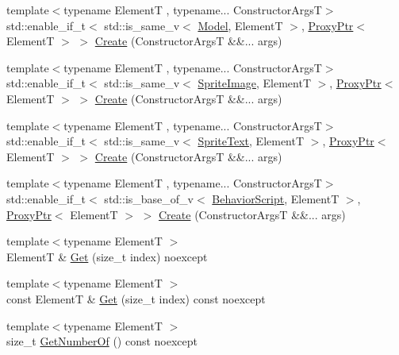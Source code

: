 \begin{DoxyCompactItemize}
\item 
{\footnotesize template$<$typename ElementT , typename... Constructor\+ArgsT$>$ }\\std\+::enable\+\_\+if\+\_\+t$<$ std\+::is\+\_\+same\+\_\+v$<$ \hyperlink{classmage_1_1_model}{Model}, ElementT $>$, \hyperlink{classmage_1_1_proxy_ptr}{Proxy\+Ptr}$<$ ElementT $>$ $>$ \hyperlink{classmage_1_1_scene_a0f8724805acbb6ae4ca5155306154ab1}{Create} (Constructor\+ArgsT \&\&... args)
\item 
{\footnotesize template$<$typename ElementT , typename... Constructor\+ArgsT$>$ }\\std\+::enable\+\_\+if\+\_\+t$<$ std\+::is\+\_\+same\+\_\+v$<$ \hyperlink{classmage_1_1_sprite_image}{Sprite\+Image}, ElementT $>$, \hyperlink{classmage_1_1_proxy_ptr}{Proxy\+Ptr}$<$ ElementT $>$ $>$ \hyperlink{classmage_1_1_scene_a80e11f9f4424a0d250b1f83fe2caf275}{Create} (Constructor\+ArgsT \&\&... args)
\item 
{\footnotesize template$<$typename ElementT , typename... Constructor\+ArgsT$>$ }\\std\+::enable\+\_\+if\+\_\+t$<$ std\+::is\+\_\+same\+\_\+v$<$ \hyperlink{classmage_1_1_sprite_text}{Sprite\+Text}, ElementT $>$, \hyperlink{classmage_1_1_proxy_ptr}{Proxy\+Ptr}$<$ ElementT $>$ $>$ \hyperlink{classmage_1_1_scene_a8c1fe27bd2930d8300265332631ec5c0}{Create} (Constructor\+ArgsT \&\&... args)
\item 
{\footnotesize template$<$typename ElementT , typename... Constructor\+ArgsT$>$ }\\std\+::enable\+\_\+if\+\_\+t$<$ std\+::is\+\_\+base\+\_\+of\+\_\+v$<$ \hyperlink{classmage_1_1_behavior_script}{Behavior\+Script}, ElementT $>$, \hyperlink{classmage_1_1_proxy_ptr}{Proxy\+Ptr}$<$ ElementT $>$ $>$ \hyperlink{classmage_1_1_scene_ab135fe20ddadf6c1e2820a9582a31e64}{Create} (Constructor\+ArgsT \&\&... args)
\item 
{\footnotesize template$<$typename ElementT $>$ }\\ElementT \& \hyperlink{classmage_1_1_scene_a51322766fa1e347d71fb8feb09675bf4}{Get} (size\+\_\+t index) noexcept
\item 
{\footnotesize template$<$typename ElementT $>$ }\\const ElementT \& \hyperlink{classmage_1_1_scene_a80da83574645fabca847697a7ca38fa7}{Get} (size\+\_\+t index) const noexcept
\item 
{\footnotesize template$<$typename ElementT $>$ }\\size\+\_\+t \hyperlink{classmage_1_1_scene_a308480749d009dad3a39333fd0c59f2a}{Get\+Number\+Of} () const noexcept

\end{DoxyCompactItemize}
